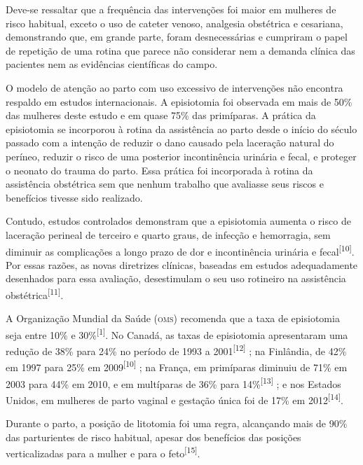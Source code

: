 \documentclass{article}
\begin{document}
Deve-se ressaltar que a frequência das intervenções foi maior em mulheres de
risco
habitual, exceto o uso de cateter venoso, analgesia obstétrica e cesariana,
demonstrando que, em grande parte, foram desnecessárias e cumpriram o papel de
repetição de uma rotina que parece não considerar nem a demanda clínica das
pacientes nem as evidências científicas do campo.

O modelo de atenção ao parto com uso excessivo de intervenções não encontra
respaldo
em estudos internacionais. A episiotomia foi observada em mais de 50\% das
mulheres
deste estudo e em quase 75\% das primíparas. A prática da episiotomia se
incorporou à
rotina da assistência ao parto desde o início do século passado com a intenção
de
reduzir o dano causado pela laceração natural do períneo, reduzir o risco de uma
posterior incontinência urinária e fecal, e proteger o neonato do trauma do
parto.
Essa prática foi incorporada à rotina da assistência obstétrica sem que nenhum
trabalho que avaliasse seus riscos e benefícios tivesse sido realizado.

Contudo, estudos controlados demonstram que a episiotomia aumenta o risco de
laceração perineal de terceiro e quarto graus, de infecção e hemorragia, sem
diminuir as complicações a longo prazo de dor e incontinência urinária e fecal\textsuperscript{[}\textsuperscript{10}\textsuperscript{]}. Por essas razões, as novas
diretrizes clínicas, baseadas em estudos adequadamente desenhados para essa
avaliação, desestimulam o seu uso rotineiro na assistência obstétrica\textsuperscript{[}\textsuperscript{11}\textsuperscript{]}.

A Organização Mundial da Saúde (\textsc{oms}) recomenda que a taxa de episiotomia seja
entre
10\% e 30\%\textsuperscript{[}\textsuperscript{1}\textsuperscript{]}. No Canadá, as taxas de
episiotomia apresentaram uma redução de 38\% para 24\% no período de 1993 a 2001\textsuperscript{[}\textsuperscript{12}\textsuperscript{]}
; na Finlândia, de 42\% em 1997
para 25\% em 2009\textsuperscript{[}\textsuperscript{10}\textsuperscript{]}
; na França, em
primíparas diminuiu de 71\% em 2003 para 44\% em 2010, e em multíparas de 36\%
para 14\%\textsuperscript{[}\textsuperscript{13}\textsuperscript{]}
; e nos Estados Unidos, em
mulheres de parto vaginal e gestação única foi de 17\% em 2012\textsuperscript{[}\textsuperscript{14}\textsuperscript{]}.

Durante o parto, a posição de litotomia foi uma regra, alcançando mais de 90\%
das
parturientes de risco habitual, apesar dos benefícios das posições
verticalizadas
para a mulher e para o feto\textsuperscript{[}\textsuperscript{15}\textsuperscript{]}.
\end{document}
